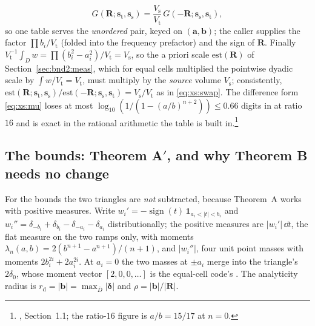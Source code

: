 \begin{equation}
G(\mathbf{R};\mathbf{s}_{\mathrm{t}},\mathbf{s}_{\mathrm{s}}) =
\frac{V_{\mathrm{s}}}{V_{\mathrm{t}}}\,G(-\mathbf{R};\mathbf{s}_{\mathrm{s}},\mathbf{s}_{\mathrm{t}}),
\label{eq:xs:swap}
\end{equation}
so one table serves the \emph{unordered} pair, keyed on $(\mathbf{a},\mathbf{b})$; the
caller supplies the factor $\prod b_i/V_{\mathrm{t}}$ (folded into the frequency
prefactor) and the sign of $\mathbf{R}$. Finally $V_{\mathrm{t}}^{-1}\int_Dw =
\prod(b_i^2-a_i^2)/V_{\mathrm{t}} = V_{\mathrm{s}}$, so the a priori scale
$\mathrm{est}(\mathbf{R})$ of Section~\ref{sec:bnd2:meas}, which for equal cells
multiplied the pointwise dyadic scale by $\int w/V_{\mathrm{t}} = V_{\mathrm{t}}$, must
multiply by the \emph{source} volume $V_{\mathrm{s}}$; consistently,
$\mathrm{est}(\mathbf{R};\mathbf{s}_{\mathrm{t}},\mathbf{s}_{\mathrm{s}})/
\mathrm{est}(-\mathbf{R};\mathbf{s}_{\mathrm{s}},\mathbf{s}_{\mathrm{t}}) = V_{\mathrm{s}}/V_{\mathrm{t}}$
as in \eqref{eq:xs:swap}. The difference form \eqref{eq:xs:mu} loses at most
$\log_{10}(1/(1-(a/b)^{n+2})) \le 0.66$ digits in  at ratio $16$ and is
exact in the rational arithmetic the table is built in.\footnote{,
Section~1.1; the ratio-$16$ figure is $a/b = 15/17$ at $n = 0$.}

\subsection{The bounds: Theorem A$'$, and why Theorem B needs no change}
\label{sec:xs:bnd}

For the bounds the two triangles are \emph{not} subtracted, because Theorem~A works with
positive measures. Write $w_i' = -\operatorname{sign}(t)\,\mathbf 1_{a_i<|t|<b_i}$ and
$w_i'' = \delta_{-b_i}+\delta_{b_i}-\delta_{-a_i}-\delta_{a_i}$ distributionally; the
positive measures are $|w_i'|\,\dd t$, the flat measure on the two ramps only, with moments
$\lambda_n(a,b) = 2(b^{n+1}-a^{n+1})/(n+1)$, and $|w_i''|$, four unit point masses with
moments $2b_i^{2i}+2a_i^{2i}$. At $a_i = 0$ the two masses at $\pm a_i$ merge into the
triangle's $2\delta_0$, whose moment vector $[2,0,0,\dots]$ is the equal-cell code's
. The analyticity radius is $r_{\mathrm{d}} = |\mathbf{b}| = \max_{\overline D}|\boldsymbol\delta|$
and $\rho = |\mathbf{b}|/|\mathbf{R}|$.

